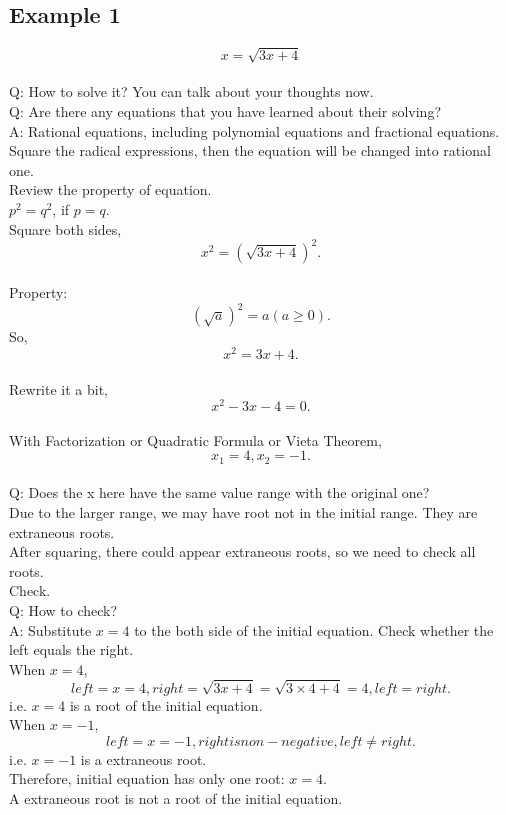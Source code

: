 \begin{CJK}{UTF8}{gkai}
\subsection{Example 1}
$$x=\sqrt{3x+4}$$\\
Q: How to solve it? You can talk about your thoughts now.\\
Q: Are there any equations that you have learned about their solving?\\
A: Rational equations, including polynomial equations and fractional equations.\vspace{6mm}
\\Square the radical expressions, then the equation will be changed into rational one.\\
Review the property of equation. \\
$p^2=q^2$, if $p=q$.\\
Square both sides,\\
$$x^2=(\sqrt{3x+4})^2.$$
\vspace{6mm}
\\Property:$$(\sqrt{a})^2=a(a \ge 0).$$
So,
$$x^2=3x+4.$$
\\Rewrite it a bit, $$x^2-3x-4=0.$$
\\With Factorization or Quadratic Formula or Vieta Theorem, $$x_1=4, x_2=-1.$$
\vspace{6mm}
\\Q: Does the x here have the same value range with the original one? 
\\Due to the larger range, we may have root not in the initial range. They are extraneous roots.
\\After squaring, there could appear extraneous roots, so we need to check all roots.
\vspace{6mm}
\\Check.
\\Q: How to check?
\\A: Substitute $x=4$ to the both side of the initial equation. Check whether the left equals the right.
\\When $x=4$, $$left=x=4,  right=\sqrt{3x+4}=\sqrt{3\times4+4}=4, left=right.$$
i.e. $x=4$ is a root of the initial equation.
\\When $x= -1$, $$left=x= -1,  right is non-negative, left \neq right.$$
i.e. $x=-1$ is a extraneous root.
\\Therefore, initial equation has only one root: $x=4$.
\\A extraneous root is not a root of the initial equation.


\end{CJK}
